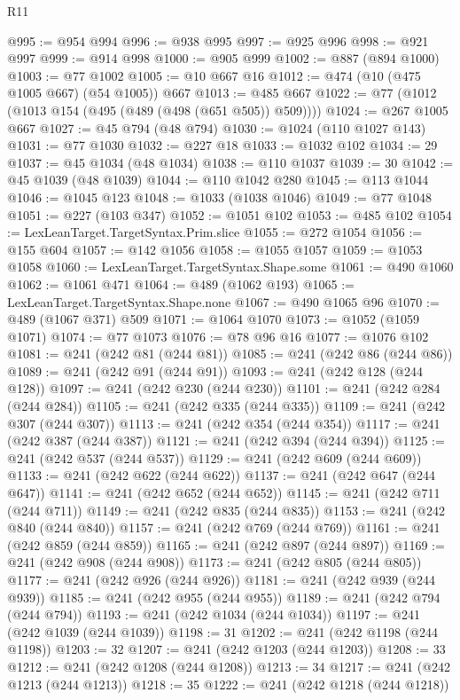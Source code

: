 \begin{lexlean}{R11}
\begin{coremodule}
{{{{{{{{{{{{{{{{{{{{{{{{{{{{{{{{{{{{{{{{{{{{{{{{{{{{{{{{{{{{{{{{{{{{{{{{{{{{{{{{{{{{{{{{{{{{{{{{{{{{{{{{{{@995 := @954 @994
@996 := @938 @995
@997 := @925 @996
@998 := @921 @997
@999 := @914 @998
@1000 := @905 @999
@1002 := @887 (@894 @1000)
@1003 := @77 @1002
@1005 := @10 @667 @16
@1012 := @474 (@10 (@475 @1005 @667) (@54 @1005)) @667
@1013 := @485 @667
@1022 := @77 (@1012 (@1013 @154 (@495 (@489 (@498 (@651 @505)) @509))))
@1024 := @267 @1005 @667
@1027 := @45 @794 (@48 @794)
@1030 := @1024 (@110 @1027 @143)
@1031 := @77 @1030
@1032 := @227 @18
@1033 := @1032 @102
@1034 := 29
@1037 := @45 @1034 (@48 @1034)
@1038 := @110 @1037
@1039 := 30
@1042 := @45 @1039 (@48 @1039)
@1044 := @110 @1042 @280
@1045 := @113 @1044
@1046 := @1045 @123
@1048 := @1033 (@1038 @1046)
@1049 := @77 @1048
@1051 := @227 (@103 @347)
@1052 := @1051 @102
@1053 := @485 @102
@1054 := LexLeanTarget.TargetSyntax.Prim.slice
@1055 := @272 @1054
@1056 := @155 @604
@1057 := @142 @1056
@1058 := @1055 @1057
@1059 := @1053 @1058
@1060 := LexLeanTarget.TargetSyntax.Shape.some
@1061 := @490 @1060
@1062 := @1061 @471
@1064 := @489 (@1062 @193)
@1065 := LexLeanTarget.TargetSyntax.Shape.none
@1067 := @490 @1065 @96
@1070 := @489 (@1067 @371) @509
@1071 := @1064 @1070
@1073 := @1052 (@1059 @1071)
@1074 := @77 @1073
@1076 := @78 @96 @16
@1077 := @1076 @102
@1081 := @241 (@242 @81 (@244 @81))
@1085 := @241 (@242 @86 (@244 @86))
@1089 := @241 (@242 @91 (@244 @91))
@1093 := @241 (@242 @128 (@244 @128))
@1097 := @241 (@242 @230 (@244 @230))
@1101 := @241 (@242 @284 (@244 @284))
@1105 := @241 (@242 @335 (@244 @335))
@1109 := @241 (@242 @307 (@244 @307))
@1113 := @241 (@242 @354 (@244 @354))
@1117 := @241 (@242 @387 (@244 @387))
@1121 := @241 (@242 @394 (@244 @394))
@1125 := @241 (@242 @537 (@244 @537))
@1129 := @241 (@242 @609 (@244 @609))
@1133 := @241 (@242 @622 (@244 @622))
@1137 := @241 (@242 @647 (@244 @647))
@1141 := @241 (@242 @652 (@244 @652))
@1145 := @241 (@242 @711 (@244 @711))
@1149 := @241 (@242 @835 (@244 @835))
@1153 := @241 (@242 @840 (@244 @840))
@1157 := @241 (@242 @769 (@244 @769))
@1161 := @241 (@242 @859 (@244 @859))
@1165 := @241 (@242 @897 (@244 @897))
@1169 := @241 (@242 @908 (@244 @908))
@1173 := @241 (@242 @805 (@244 @805))
@1177 := @241 (@242 @926 (@244 @926))
@1181 := @241 (@242 @939 (@244 @939))
@1185 := @241 (@242 @955 (@244 @955))
@1189 := @241 (@242 @794 (@244 @794))
@1193 := @241 (@242 @1034 (@244 @1034))
@1197 := @241 (@242 @1039 (@244 @1039))
@1198 := 31
@1202 := @241 (@242 @1198 (@244 @1198))
@1203 := 32
@1207 := @241 (@242 @1203 (@244 @1203))
@1208 := 33
@1212 := @241 (@242 @1208 (@244 @1208))
@1213 := 34
@1217 := @241 (@242 @1213 (@244 @1213))
@1218 := 35
@1222 := @241 (@242 @1218 (@244 @1218))
}}}}}}}}}}}}}}}}}}}}}}}}}}}}}}}}}}}}}}}}}}}}}}}}}}}}}}}}}}}}}}}}}}}}}}}}}}}}}}}}}}}}}}}}}}}}}}}}}}}}}}}}}}
\end{coremodule}
\end{lexlean}
